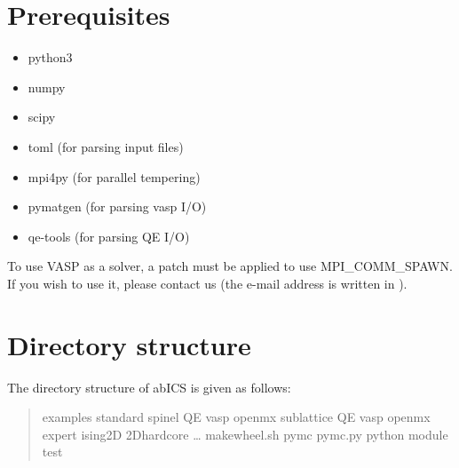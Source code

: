 \documentclass[letterpaper,10pt,english]{sphinxmanual}
\begin{document}
\section{Prerequisites}
\label{\detokenize{install/install:prerequisites}}\begin{itemize}
\item {} 
python3

\item {} 
numpy

\item {} 
scipy

\item {} 
toml (for parsing input files)

\item {} 
mpi4py (for parallel tempering)

\item {} 
pymatgen (for parsing vasp I/O)

\item {} 
qe-tools (for parsing QE I/O)

\end{itemize}

To use VASP as a solver, a patch must be applied to use MPI\_COMM\_SPAWN. If you wish to use it, please contact us (the e-mail address is written in {\hyperref[\detokenize{contact/index::doc}]{}} ).


\section{Directory structure}
\label{\detokenize{install/install:directory-structure}}
The directory structure of abICS is given as follows:
\begin{quote}

\begin{sphinxVerbatim}[commandchars=\\\{\}]
 \PYGZhy{} examples
    \PYGZhy{} standard
        \PYGZhy{} spinel
            \PYGZhy{} QE
            \PYGZhy{} vasp
            \PYGZhy{} openmx
        \PYGZhy{} sub\PYGZhy{}lattice
            \PYGZhy{} QE
            \PYGZhy{} vasp
            \PYGZhy{} openmx
    \PYGZhy{} expert
        \PYGZhy{} ising2D
        \PYGZhy{} 2D\PYGZus{}hardcore
        …
\PYGZhy{} make\PYGZus{}wheel.sh
\PYGZhy{} py\PYGZus{}mc
    \PYGZhy{} pymc.py
    \PYGZhy{} python module
\PYGZhy{} test
\end{sphinxVerbatim}
\end{quote}
\end{document}
